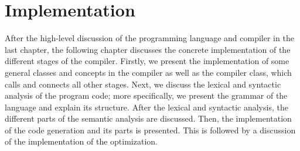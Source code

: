 \chapter{Implementation}
\label{ch:implementation}
After the high-level discussion of the programming language and compiler in the last chapter, the following chapter discusses the concrete implementation of the different stages of the compiler. Firstly, we present the implementation of some general classes and concepts in the compiler as well as the compiler class, which calls and connects all other stages. Next, we discuss the lexical and syntactic analysis of the program code; more specifically, we present the grammar of the language and explain its structure. After the lexical and syntactic analysis, the different parts of the semantic analysis are discussed. Then, the implementation of the code generation and its parts is presented. This is followed by a discussion of the implementation of the optimization. 












% 